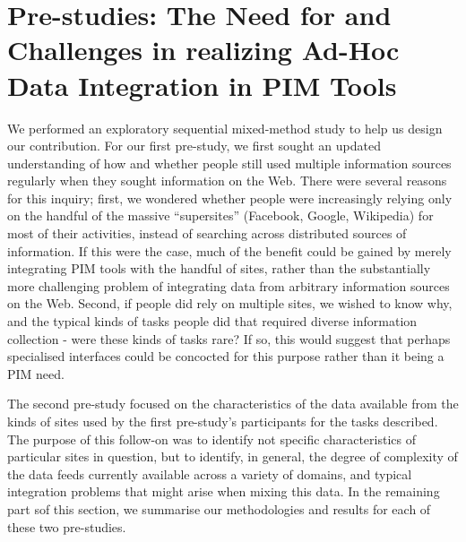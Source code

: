 \documentclass{sigchi}
\begin{document}
\section{Pre-studies: The Need for and Challenges in realizing Ad-Hoc Data Integration in PIM Tools}


We performed an exploratory sequential mixed-method study to help us design our contribution. For our first pre-study, we first sought an updated understanding of how and whether people still used multiple information sources regularly when they sought information on the Web. There were several reasons for this inquiry; first, we wondered whether people were increasingly relying only on the handful of the massive ``supersites'' (Facebook, Google, Wikipedia) for most of their activities, instead of  searching across distributed sources of information.  If this were the case, much of the benefit could be gained by merely integrating PIM tools with the handful of sites, rather than the substantially more challenging problem of integrating data from arbitrary information sources on the Web.   Second, if people did rely on multiple sites, we wished to know why, and the typical kinds of tasks people did that required diverse information collection - were these kinds of tasks rare?  If so, this would suggest that perhaps specialised interfaces could be concocted for this purpose rather than it being a PIM need. 

The second pre-study focused on the characteristics of the data available from the kinds of sites used by the first pre-study's participants for the tasks described. The purpose of this follow-on  was to identify not specific characteristics of particular sites in question, but to identify, in general, the degree of complexity of the data feeds currently available across a variety of domains, and typical integration problems that might arise when mixing this data. In the remaining part sof this section, we summarise our methodologies and results for each of these two pre-studies.

\end{document}
